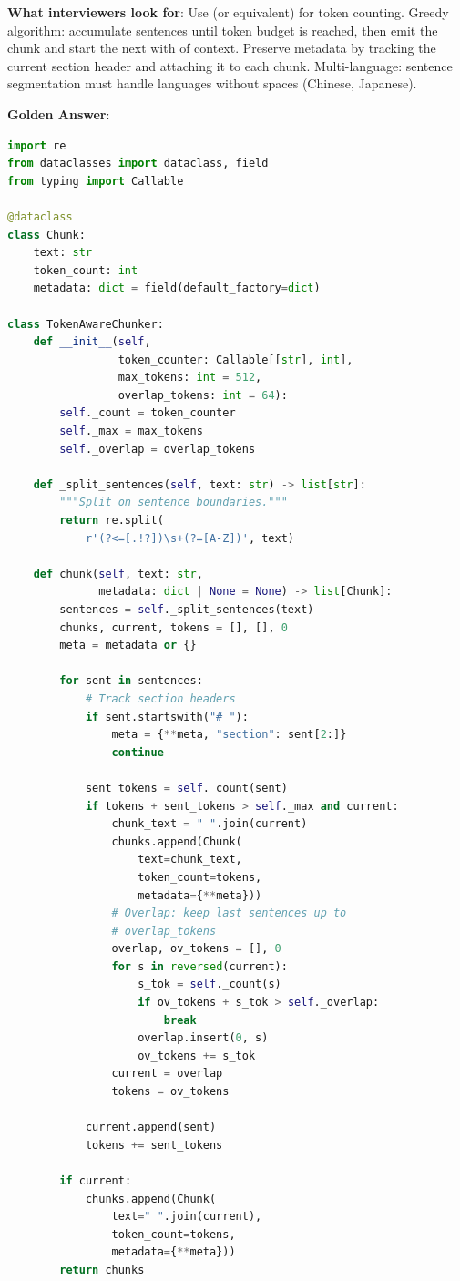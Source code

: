 \textbf{What interviewers look for}: Use  (or equivalent) for token counting. Greedy algorithm: accumulate sentences until token budget is reached, then emit the chunk and start the next with  of context. Preserve metadata by tracking the current section header and attaching it to each chunk. Multi-language: sentence segmentation must handle languages without spaces (Chinese, Japanese).

\textbf{Golden Answer}:

\begin{lstlisting}[language=Python]
import re
from dataclasses import dataclass, field
from typing import Callable

@dataclass
class Chunk:
    text: str
    token_count: int
    metadata: dict = field(default_factory=dict)

class TokenAwareChunker:
    def __init__(self,
                 token_counter: Callable[[str], int],
                 max_tokens: int = 512,
                 overlap_tokens: int = 64):
        self._count = token_counter
        self._max = max_tokens
        self._overlap = overlap_tokens

    def _split_sentences(self, text: str) -> list[str]:
        """Split on sentence boundaries."""
        return re.split(
            r'(?<=[.!?])\s+(?=[A-Z])', text)

    def chunk(self, text: str,
              metadata: dict | None = None) -> list[Chunk]:
        sentences = self._split_sentences(text)
        chunks, current, tokens = [], [], 0
        meta = metadata or {}

        for sent in sentences:
            # Track section headers
            if sent.startswith("# "):
                meta = {**meta, "section": sent[2:]}
                continue

            sent_tokens = self._count(sent)
            if tokens + sent_tokens > self._max and current:
                chunk_text = " ".join(current)
                chunks.append(Chunk(
                    text=chunk_text,
                    token_count=tokens,
                    metadata={**meta}))
                # Overlap: keep last sentences up to
                # overlap_tokens
                overlap, ov_tokens = [], 0
                for s in reversed(current):
                    s_tok = self._count(s)
                    if ov_tokens + s_tok > self._overlap:
                        break
                    overlap.insert(0, s)
                    ov_tokens += s_tok
                current = overlap
                tokens = ov_tokens

            current.append(sent)
            tokens += sent_tokens

        if current:
            chunks.append(Chunk(
                text=" ".join(current),
                token_count=tokens,
                metadata={**meta}))
        return chunks
\end{lstlisting}

